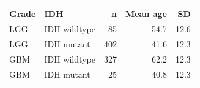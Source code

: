 \begin{tabular}{llrrr}
\toprule
\textbf{Grade} & \textbf{IDH} & \textbf{n} & \textbf{Mean age} & \textbf{SD} \\
\midrule
LGG & IDH wildtype & 85 & 54.7 & 12.6 \\
LGG & IDH mutant & 402 & 41.6 & 12.3 \\
GBM & IDH wildtype & 327 & 62.2 & 12.3 \\
GBM & IDH mutant & 25 & 40.8 & 12.3 \\
\bottomrule
\end{tabular}
